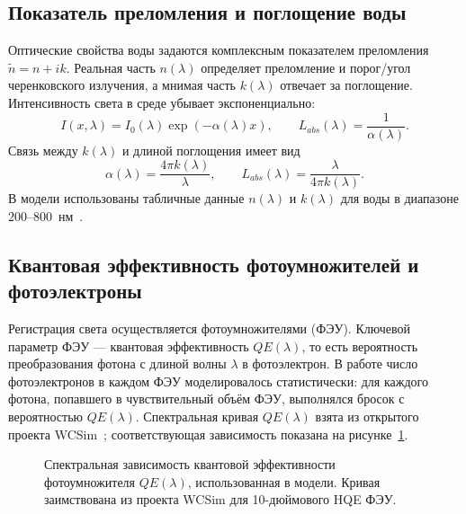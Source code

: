 \documentclass[a4paper,12pt]{extarticle}
\begin{document}
\subsection{Показатель преломления и поглощение воды}
Оптические свойства воды задаются комплексным показателем преломления $\tilde{n}=n+ik$. Реальная часть $n(\lambda)$ определяет преломление и порог/угол черенковского излучения, а мнимая часть $k(\lambda)$ отвечает за поглощение. Интенсивность света в среде убывает экспоненциально:
\begin{equation}
    I(x,\lambda)=I_0(\lambda)\exp\left(-\alpha(\lambda)x\right),\qquad L_{abs}(\lambda)=\frac{1}{\alpha(\lambda)}.
\end{equation}
Связь между $k(\lambda)$ и длиной поглощения имеет вид
\begin{equation}
    \alpha(\lambda)=\frac{4\pi k(\lambda)}{\lambda},\qquad L_{abs}(\lambda)=\frac{\lambda}{4\pi k(\lambda)}.
\end{equation}
В модели использованы табличные данные $n(\lambda)$ и $k(\lambda)$ для воды в диапазоне $200$--$800$~нм~\cite{hale1973}.

\subsection{Квантовая эффективность фотоумножителей и фотоэлектроны}
Регистрация света осуществляется фотоумножителями (ФЭУ). Ключевой параметр ФЭУ — квантовая эффективность $QE(\lambda)$, то есть вероятность преобразования фотона с длиной волны $\lambda$ в фотоэлектрон. В работе число фотоэлектронов в каждом ФЭУ моделировалось статистически: для каждого фотона, попавшего в чувствительный объём ФЭУ, выполнялся бросок с вероятностью $QE(\lambda)$. Спектральная кривая $QE(\lambda)$ взята из открытого проекта WCSim~\cite{wcsim}; соответствующая зависимость показана на рисунке~\ref{fig:qe_wcsim}.

\begin{figure}[h]
\centering
{}
\caption{Спектральная зависимость квантовой эффективности фотоумножителя $QE(\lambda)$, использованная в модели. Кривая заимствована из проекта WCSim для 10-дюймового HQE ФЭУ.}
\label{fig:qe_wcsim}
\end{figure}
\end{document}
